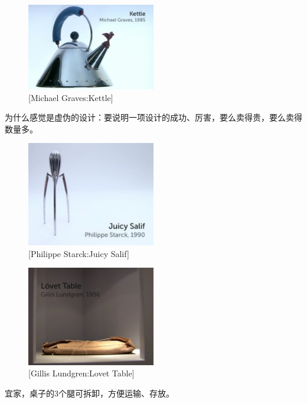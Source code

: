 \documentclass[UTF8]{../../../../RepresentationUniverse}
\begin{document}
\begin{figure}[h]
    \centering
    \includegraphics[width=0.5\textwidth]{./src/figures/Kettle_2023-04-09_21-21-57.png}
    \caption{[Michael Graves:Kettle]}
    \label{figure:Kettle}
\end{figure}

为什么感觉是虚伪的设计：要说明一项设计的成功、厉害，要么卖得贵，要么卖得数量多。

\begin{figure}[h]
    \centering
    \includegraphics[width=0.5\textwidth]{./src/figures/Juicy Salif_2023-04-09_21-25-09.png}
    \caption{[Philippe Starck:Juicy Salif]}
    \label{figure:Juicy Salif}
\end{figure}


\begin{figure}[h]
    \centering
    \includegraphics[width=0.5\textwidth]{./src/figures/Lovet Table_2023-04-09_21-30-09.png}
    \caption{[Gillis Lundgren:Lovet Table]}
    \label{figure:Lovet Table}
\end{figure}
宜家，桌子的3个腿可拆卸，方便运输、存放。
\end{document}

